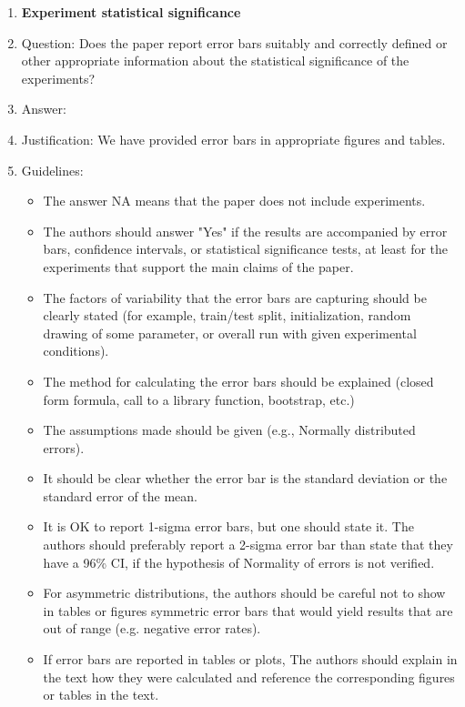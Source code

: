 \documentclass{article}
\theoremstyle{plain}
\theoremstyle{definition}
\theoremstyle{remark}
\begin{document}
\begin{enumerate}
\item {\bf Experiment statistical significance}
    \item[] Question: Does the paper report error bars suitably and correctly defined or other appropriate information about the statistical significance of the experiments?
    \item[] Answer: \answerYes{} %
    \item[] Justification: We have provided error bars in appropriate figures and tables.
    \item[] Guidelines:
    \begin{itemize}
        \item The answer NA means that the paper does not include experiments.
        \item The authors should answer "Yes" if the results are accompanied by error bars, confidence intervals, or statistical significance tests, at least for the experiments that support the main claims of the paper.
        \item The factors of variability that the error bars are capturing should be clearly stated (for example, train/test split, initialization, random drawing of some parameter, or overall run with given experimental conditions).
        \item The method for calculating the error bars should be explained (closed form formula, call to a library function, bootstrap, etc.)
        \item The assumptions made should be given (e.g., Normally distributed errors).
        \item It should be clear whether the error bar is the standard deviation or the standard error of the mean.
        \item It is OK to report 1-sigma error bars, but one should state it. The authors should preferably report a 2-sigma error bar than state that they have a 96\% CI, if the hypothesis of Normality of errors is not verified.
        \item For asymmetric distributions, the authors should be careful not to show in tables or figures symmetric error bars that would yield results that are out of range (e.g. negative error rates).
        \item If error bars are reported in tables or plots, The authors should explain in the text how they were calculated and reference the corresponding figures or tables in the text.
    \end{itemize}


\end{enumerate}
\end{document}
